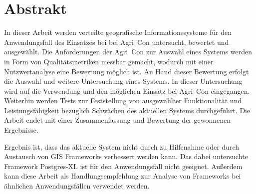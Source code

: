 
\chapter*{Abstrakt}
\label{sec:Abstrakt}
In dieser Arbeit werden verteilte geografische Informationssysteme für den Anwendungsfall des Einsatzes bei bei Agri~Con untersucht, bewertet und ausgewählt.
Die Anforderungen der Agri~Con zur Auswahl eines Systems werden in Form von Qualitätsmetriken messbar gemacht, wodurch mit einer Nutzwertanalyse eine Bewertung möglich ist.
An Hand dieser Bewertung erfolgt die Auswahl und weitere Untersuchung eines Systems.
In dieser Untersuchung wird auf die Verwendung und den möglichen Einsatz bei Agri~Con eingegangen.
Weiterhin werden Tests zur Feststellung von ausgewählter Funktionalität und Leistungsfähigkeit bezüglich Schwächen des aktuellen Systems durchgeführt.
Die Arbeit endet mit einer Zusammenfassung und Bewertung der gewonnenen Ergebnisse.

Ergebnis ist, dass das aktuelle System nicht durch zu Hilfenahme oder durch Austausch von GIS Frameworks verbessert werden kann.
Das dabei untersuchte Framework Postgres-XL ist für den Anwendungsfall nicht geeignet.
Außerdem kann diese Arbeit als Handlungsempfehlung zur Analyse von Frameworks bei ähnlichen Anwendungsfällen verwendet werden.